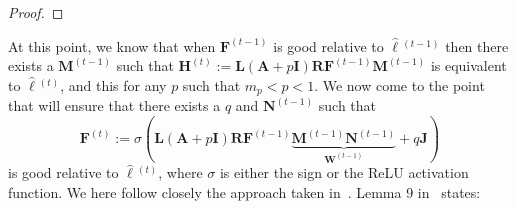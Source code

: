 \begin{proof}
\end{proof}

At this point, we know that when $\mathbf{F}^{(t-1)}$ is good relative to $\hat{\pmb{\ell}}{}^{(t-1)}$ then there exists a $\mathbf{M}^{(t-1)}$ such that $\mathbf{H}^{(t)}:=\mathbf{L}(\mathbf{A}+p\mathbf{I})\mathbf{R}\mathbf{F}^{(t-1)}\mathbf{M}^{(t-1)}$
is equivalent to $\hat{\pmb{\ell}}{}^{(t)}$, and this for any $p$ such that $m_p<p<1$.
We now come to the point that will ensure that there exists a $q$ and $\mathbf{N}^{(t-1)}$ such that
$$
\mathbf{F}^{(t)}:=\sigma(\mathbf{L}(\mathbf{A}+p\mathbf{I})\mathbf{R}\mathbf{F}^{(t-1)}\underbrace{\mathbf{M}^{(t-1)}\mathbf{N}^{(t-1)}}_{\mathbf{W}^{(t-1)}}+q\mathbf{J})$$
 is good relative to $\hat{\pmb{\ell}}{}^{(t)}$, where $\sigma$ is either the sign or the ReLU activation function. We here follow closely the approach taken in~\cite{grohewl}.
Lemma 9 in~\cite{grohewl} states:

